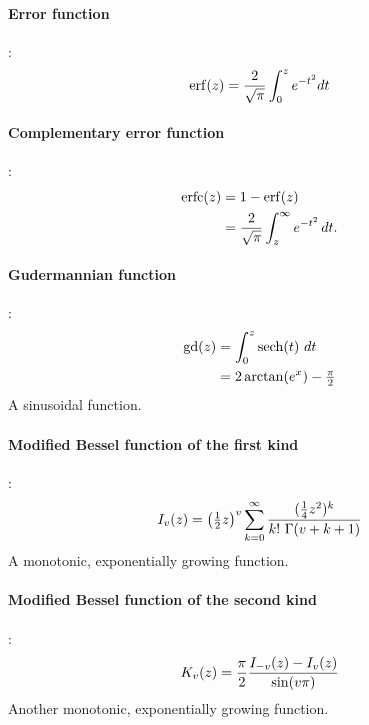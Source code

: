 \paragraph*{Error function}\hspace{-0.8em}\cite{Abramowitz1965}:
\begin{align*}
\operatorname{erf}(z) = \frac{2}{\sqrt{\pi}}\int_0^z e^{-t^2} dt		
\end{align*}


\paragraph*{Complementary error function}\hspace{-0.8em}\cite{Abramowitz1965}:
\begin{align*}
             \operatorname{erfc}(z) & = 1-\operatorname{erf}(z) 		 \\
                                    & = \frac{2}{\sqrt{\pi}} \int_z^{\infty} e^{-t^2}\,dt. 
\end{align*}


\paragraph*{Gudermannian function}\hspace{-0.8em}\cite{Abramowitz1965}:
\begin{align*}
\operatorname{gd}(z) & = \int_0^{z} \operatorname{sech}(t)\  dt 				 \\			
& = 2 \arctan(e^x) - \tfrac{\pi}{2}					
\end{align*}
A sinusoidal function. 

\paragraph*{Modified Bessel function of the first kind}\hspace{-0.8em}\cite{Abramowitz1965}:
\label{ModBesselFirst}
\[
I_v(z) = \Left(\half z \Right)^v \sum_{k=0}^{\infty}  \frac{ (\sfrac{1}{4} z^2)^k } { k!\ \Gamma(v+k+1)}
\checked
\notag
\]
A monotonic, exponentially growing function. 

\paragraph*{Modified Bessel function of the second kind}\hspace{-0.8em}\cite{Abramowitz1965}: %
\label{ModBesselSecond}
\[
K_v(z) =  \frac{\pi}{2} \frac{I_{-v} (z) - I_v (z)}{\sin (v \pi)}
\checked
\notag
\]
Another monotonic, exponentially growing function. 



